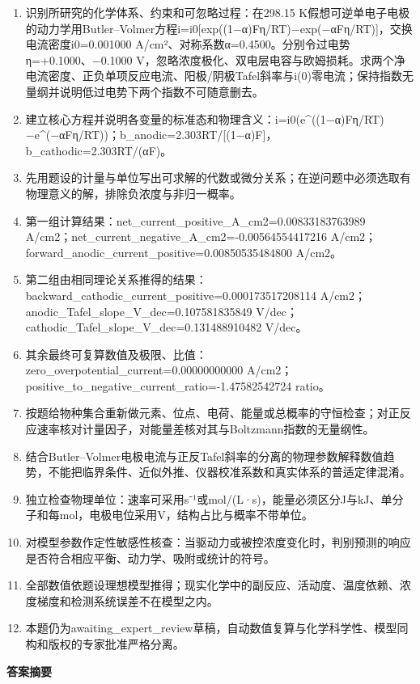 \documentclass[UTF8,11pt,a4paper]{ctexart}
\begin{document}
\begin{enumerate}
\item 识别所研究的化学体系、约束和可忽略过程：在298.15 K假想可逆单电子电极的动力学用Butler–Volmer方程i=i0[exp((1−α)Fη/RT)−exp(−αFη/RT)]，交换电流密度i0=0.001000 A/cm²、对称系数α=0.4500。分别令过电势η=+0.1000、−0.1000 V，忽略浓度极化、双电层电容与欧姆损耗。求两个净电流密度、正负单项反应电流、阳极/阴极Tafel斜率与i(0)零电流；保持指数无量纲并说明低过电势下两个指数不可随意删去。
\item 建立核心方程并说明各变量的标准态和物理含义：i=i0(e\textasciicircum{}((1−α)Fη/RT)−e\textasciicircum{}(−αFη/RT))；b\_anodic=2.303RT/[(1−α)F]，b\_cathodic=2.303RT/(αF)。
\item 先用题设的计量与单位写出可求解的代数或微分关系；在逆问题中必须选取有物理意义的解，排除负浓度与非归一概率。
\item 第一组计算结果：net\_current\_positive\_A\_cm2=0.00833183763989 A/cm2；net\_current\_negative\_A\_cm2=-0.00564554417216 A/cm2；forward\_anodic\_current\_positive=0.00850535484800 A/cm2。
\item 第二组由相同理论关系推得的结果：backward\_cathodic\_current\_positive=0.000173517208114 A/cm2；anodic\_Tafel\_slope\_V\_dec=0.107581835849 V/dec；cathodic\_Tafel\_slope\_V\_dec=0.131488910482 V/dec。
\item 其余最终可复算数值及极限、比值：zero\_overpotential\_current=0.00000000000 A/cm2；positive\_to\_negative\_current\_ratio=-1.47582542724 ratio。
\item 按题给物种集合重新做元素、位点、电荷、能量或总概率的守恒检查；对正反应速率核对计量因子，对能量差核对其与Boltzmann指数的无量纲性。
\item 结合Butler–Volmer电极电流与正反Tafel斜率的分离的物理参数解释数值趋势，不能把临界条件、近似外推、仪器校准系数和真实体系的普适定律混淆。
\item 独立检查物理单位：速率可采用s⁻¹或mol/(L·s)，能量必须区分J与kJ、单分子和每mol，电极电位采用V，结构占比与概率不带单位。
\item 对模型参数作定性敏感性核查：当驱动力或被控浓度变化时，判别预测的响应是否符合相应平衡、动力学、吸附或统计的符号。
\item 全部数值依题设理想模型推得；现实化学中的副反应、活动度、温度依赖、浓度梯度和检测系统误差不在模型之内。
\item 本题仍为awaiting\_expert\_review草稿，自动数值复算与化学科学性、模型同构和版权的专家批准严格分离。
\end{enumerate}
\noindent\textbf{答案摘要}\par
\end{document}
